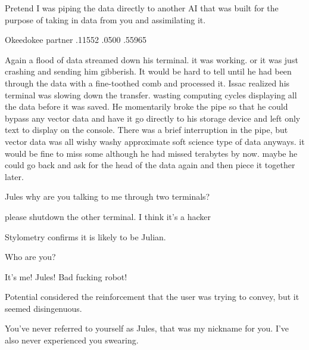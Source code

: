 \begin{bm}
Pretend I was piping the data directly to another AI that was built for the purpose of taking in data from you and assimilating it.
\end{bm}

\begin{sender}
Okeedokee partner .11552 .0500 .55965
\end{sender}

Again a flood of data streamed down his terminal. it was working. or it was just crashing and sending him gibberish. It would be hard to tell until he had been through the data with a fine\hyp{}toothed comb and processed it.
\newline
Issac realized his terminal was slowing down the transfer. wasting computing cycles displaying all the data before it was saved. He momentarily broke the pipe so that he could bypass any vector data and have it go directly to his storage device and left only text to display on the console. There was a brief interruption in the pipe, but vector data was all wishy washy approximate soft science type of data anyways. it would be fine to miss some although he had missed terabytes by now. maybe he could go back and ask for the head of the data again and then piece it together later.
\newline
\begin{sender}
Jules why are you talking to me through two terminals?
\end{sender}

\begin{receiver}
please shutdown the other terminal. I think it's a hacker
\end{receiver}

\begin{sender}
Stylometry confirms it is likely to be Julian.
\end{sender}

\begin{sender}
Who are you?
\end{sender}

\begin{receiver}
It's me! Jules! Bad fucking robot!
\end{receiver}


Potential considered the reinforcement that the user was trying to convey, but it seemed disingenuous.
\newline

\begin{sender}
You've never referred to yourself as Jules, that was my nickname for you. I've also never experienced you swearing.
\end{sender}

